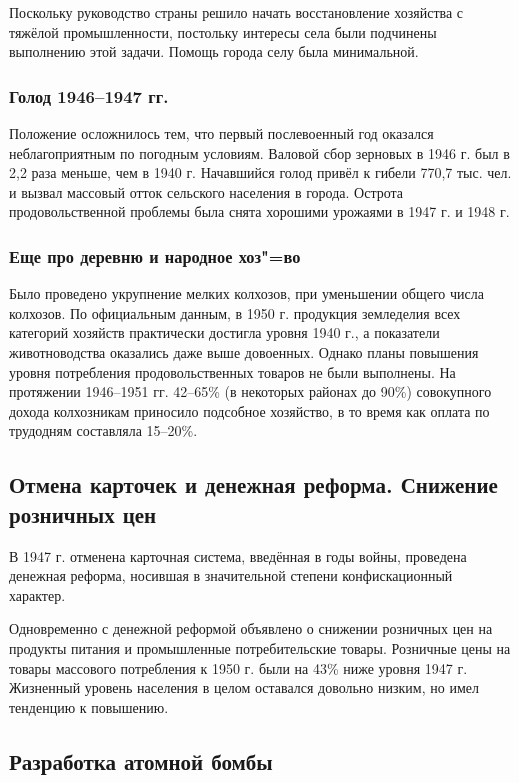 Поскольку руководство страны решило начать восстановление хозяйства с тяжёлой промышленности, постольку интересы села были подчинены выполнению этой задачи. Помощь города селу была минимальной.

\subsubsection{\textbf{Голод 1946--1947 гг.}}

Положение осложнилось тем, что первый послевоенный год оказался неблагоприятным по погодным условиям. Валовой сбор зерновых в 1946 г. был в 2,2 раза меньше, чем в 1940 г. Начавшийся голод привёл к гибели 770,7 тыс. чел. и вызвал массовый отток сельского населения в города. Острота продовольственной проблемы была снята хорошими урожаями в 1947 г. и 1948 г.

\subsubsection{\textbf{Еще про деревню и народное хоз"=во}}

Было проведено укрупнение мелких колхозов, при уменьшении общего числа колхозов. По официальным данным, в 1950 г. продукция земледелия всех категорий хозяйств практически достигла уровня 1940 г., а показатели животноводства оказались даже выше довоенных. Однако планы повышения уровня потребления продовольственных товаров не были выполнены.  На протяжении 1946--1951 гг. 42--65\% (в некоторых районах до 90\%) совокупного дохода колхозникам приносило подсобное хозяйство, в то время как оплата по трудодням составляла 15--20\%.

\subsection{Отмена карточек и денежная реформа. Снижение розничных цен}

В 1947 г. отменена карточная система, введённая в годы войны, проведена денежная реформа, носившая в значительной степени конфискационный характер. 

Одновременно с денежной реформой объявлено о снижении розничных цен на продукты питания и промышленные потребительские товары. Розничные цены на товары массового потребления к 1950 г. были на 43\% ниже уровня 1947 г. Жизненный уровень населения в целом оставался довольно низким, но имел тенденцию к повышению.

\subsection{Разработка атомной бомбы}

